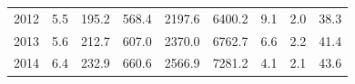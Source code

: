 \documentclass[openany]{book}
\begin{document}
\begin{table}[htbp]
{\begin{tabular}{ccccccccc}
\rowcolor[HTML]{F8F9FA} 
{\color[HTML]{202122} 2012}        & {\color[HTML]{202122} 5.5}                                                                  & {\color[HTML]{202122} 195.2}                                                                        & {\color[HTML]{202122} 568.4}                                                                    & {\color[HTML]{202122} 2197.6}                                                                              & {\color[HTML]{202122} 6400.2}                                                                          & {\color[HTML]{202122} 9.1}                                                                            & {\color[HTML]{202122} 2.0}                                                                               & {\color[HTML]{202122} 38.3}                                                                              \\
\rowcolor[HTML]{F8F9FA} 
{\color[HTML]{202122} 2013}        & {\color[HTML]{202122} 5.6}                                                                  & {\color[HTML]{202122} 212.7}                                                                        & {\color[HTML]{202122} 607.0}                                                                    & {\color[HTML]{202122} 2370.0}                                                                              & {\color[HTML]{202122} 6762.7}                                                                          & {\color[HTML]{202122} 6.6}                                                                            & {\color[HTML]{202122} 2.2}                                                                               & {\color[HTML]{202122} 41.4}                                                                              \\
\rowcolor[HTML]{F8F9FA} 
{\color[HTML]{202122} 2014}        & {\color[HTML]{202122} 6.4}                                                                  & {\color[HTML]{202122} 232.9}                                                                        & {\color[HTML]{202122} 660.6}                                                                    & {\color[HTML]{202122} 2566.9}                                                                              & {\color[HTML]{202122} 7281.2}                                                                          & {\color[HTML]{202122} 4.1}                                                                            & {\color[HTML]{202122} 2.1}                                                                               & {\color[HTML]{202122} 43.6}                                                                              \\

\end{tabular}}
\end{table}
\end{document}
